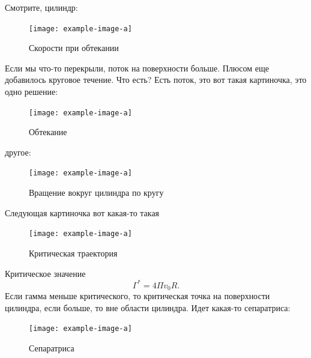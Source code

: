 Смотрите, цилиндр:
\begin{figure}[H]
    \centering
    \texttt{[image: example-image-a]}
    \caption{Скорости при обтекании}
    \label{fig:figure1}
\end{figure}

Если мы что-то перекрыли, поток на поверхности больше. Плюсом еще добавилось круговое течение. Что есть? Есть поток, это вот такая картиночка, это одно решение:
\begin{figure}[H]
    \centering
    \texttt{[image: example-image-a]}
    \caption{Обтекание}
    \label{fig:figure1}
\end{figure}

другое:
\begin{figure}[H]
    \centering
    \texttt{[image: example-image-a]}
    \caption{Вращение вокруг цилиндра по кругу}
    \label{fig:figure1}
\end{figure}

Следующая картиночка вот какая-то такая
\begin{figure}[H]
    \centering
    \texttt{[image: example-image-a]}
    \caption{Критическая траектория}
    \label{fig:figure1}
\end{figure}

Критическое значение
\begin{equation}
	\Gamma^*=4\Pi v_0 R.
\end{equation}
Если гамма меньше критического, то критическая точка на поверхности цилиндра, если больше, то вне области цилиндра. Идет какая-то сепаратриса:
\begin{figure}[H]
    \centering
    \texttt{[image: example-image-a]}
    \caption{Сепаратриса}
    \label{fig:figure1}
\end{figure}

